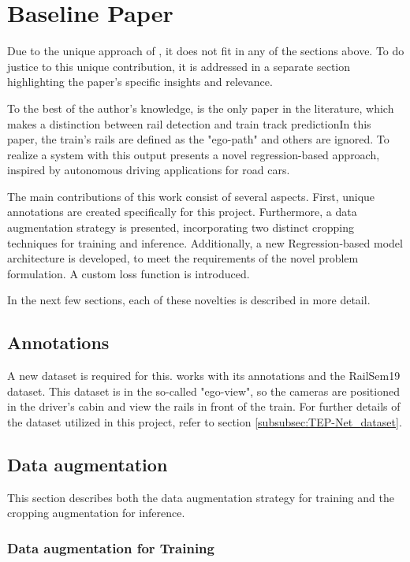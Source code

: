 \section{Baseline Paper}
\label{subsec:baselinepaper}

Due to the unique approach of \cite{tepNet2024}, it does not fit in any of the sections above.
To do justice to this unique contribution, it is addressed in a separate section highlighting the paper's specific insights and relevance. 

To the best of the author's knowledge, \cite{tepNet2024} is the only paper in the literature, which makes a distinction between rail detection and train track predictionIn this paper, the train's rails are defined as the "ego-path" and others are ignored.
To realize a system with this output \cite{tepNet2024} presents a novel regression-based approach, inspired by autonomous driving applications for road cars.

The main contributions of this work consist of several aspects.
First, unique annotations are created specifically for this project.
Furthermore, a data augmentation strategy is presented, incorporating two distinct cropping techniques for training and inference.
Additionally, a new Regression-based model architecture is developed, to meet the requirements of the novel problem formulation.
A custom loss function is introduced.

In the next few sections, each of these novelties is described in more detail.

\subsection{Annotations}

A new dataset is required for this. \cite{tepNet2024} works with its annotations and the RailSem19 dataset.
This dataset is in the so-called "ego-view", so the cameras are positioned in the driver's cabin and view the rails in front of the train.
For further details of the dataset utilized in this project, refer to section \ref{subsubsec:TEP-Net_dataset}.

\subsection{Data augmentation}

This section describes both the data augmentation strategy for training and the cropping augmentation for inference.

\subsubsection{Data augmentation for Training}

